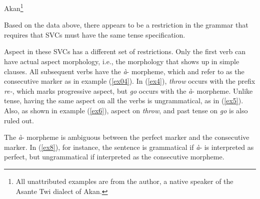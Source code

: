 \documentclass[output=paper,colorlinks,citecolor=brown]{langscibook}
\begin{document}
\ea \label{ex0}
Akan\footnote{All unattributed examples are from the author, a native speaker of the Asante Twi dialect of Akan.} 

\z
\z
Based on the data above, there appears to be a restriction in the grammar that requires that SVCs must have the same tense specification.    

Aspect in these SVCs has a different set of restrictions. Only the first verb can have actual aspect morphology, i.e., the morphology that shows up in simple clauses. All subsequent verbs have the \emph{à}- morpheme, which \citet{Dolphyne1996} and \citet{Osam2003} refer to as the consecutive marker as in example (\ref{ex04}). In (\ref{ex4}), \emph{throw} occurs with the prefix \emph{re-}, which marks progressive aspect, but \emph{go} occurs with the \emph{à}- morpheme. Unlike tense, having the same aspect on all the verbs is ungrammatical, as in (\ref{ex5}). Also, as shown in example (\ref{ex6}), aspect on \emph{throw}, and past tense on \emph{go} is also ruled out. 

\ea\label{ex:04}
\z 
\z 
The \emph{à}- morpheme is ambiguous between the perfect marker and the consecutive marker. In (\ref{ex8}), for instance, the sentence is grammatical if \emph{à}- is interpreted as perfect, but ungrammatical if interpreted as the consecutive morpheme.
\end{document}
